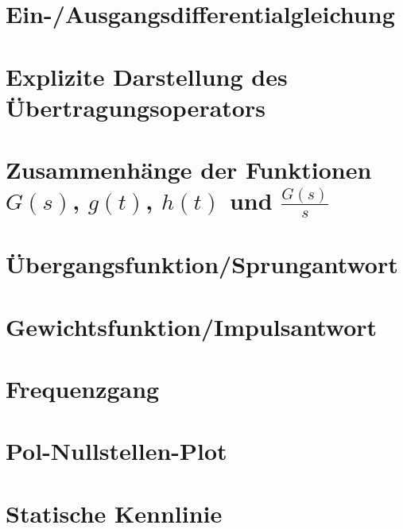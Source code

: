 \documentclass[
  ngerman
  ,12pt
  ,pdftex
]{article}
\begin{document}
\section{Ein-/Ausgangsdifferentialgleichung}    %


\section{Explizite Darstellung des Übertragungsoperators}


\section{Zusammenhänge der Funktionen $G(s)$, $g(t)$, $h(t)$ und $\frac{G(s)}{s}$}


\section{Übergangsfunktion/Sprungantwort}


\section{Gewichtsfunktion/Impulsantwort}


\section{Frequenzgang}


\section{Pol-Nullstellen-Plot}


\section{Statische Kennlinie}

\end{document}
